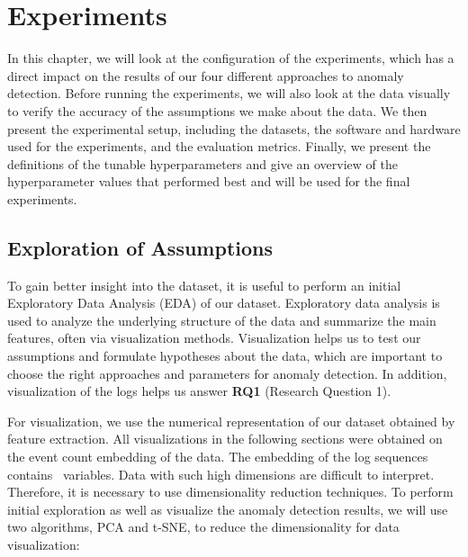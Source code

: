 \chapter{Experiments}
\label{chapter:experiments}

In this chapter, we will look at the configuration of the experiments, which has a direct impact on the results of our four different approaches to anomaly detection. Before running the experiments, we will also look at the data visually to verify the accuracy of the assumptions we make about the data. We then present the experimental setup, including the datasets, the software and hardware used for the experiments, and the evaluation metrics. Finally, we present the definitions of the tunable hyperparameters and give an overview of the hyperparameter values that performed best and will be used for the final experiments.

\section{Exploration of Assumptions}
To gain better insight into the dataset, it is useful to perform an initial Exploratory Data Analysis (EDA) \cite{eda} of our dataset. Exploratory data analysis is used to analyze the underlying structure of the data and summarize the main features, often via visualization methods. Visualization helps us to test our assumptions and formulate hypotheses about the data, which are important to choose the right approaches and parameters for anomaly detection. In addition, visualization of the logs helps us answer \textbf{RQ1} (Research Question 1).

For visualization, we use the numerical representation of our dataset obtained by feature extraction. All visualizations in the following sections were obtained on the event count embedding of the data. The embedding of the log sequences contains \featureVectorLength\ variables. Data with such high dimensions are difficult to interpret. Therefore, it is necessary to use dimensionality reduction techniques. To perform initial exploration as well as visualize the anomaly detection results, we will use two algorithms, PCA and t-SNE, to reduce the dimensionality for data visualization:

